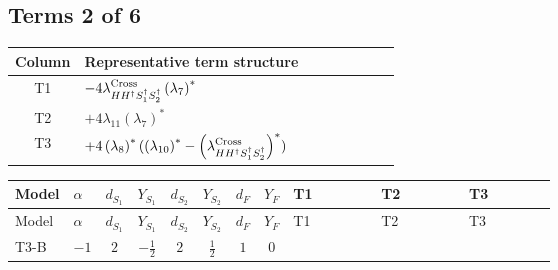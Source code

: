 \documentclass[8pt]{article}
\begin{document}
\begin{landscape}
\subsection*{Terms 2 of 6}
\begin{center}
\begin{tabular}{@{}c >{\raggedright\arraybackslash}p{0.82\linewidth}@{}}
\toprule
Column & Representative term structure \\
\midrule
T1 & \(\displaystyle -4 {\lambda_{H H^\dagger S_1^\dagger S_2^\dagger}^{\rm Cross}} \left({\lambda_7}\right)^{*}\) \\
\midrule
T2 & \(\displaystyle +4 {\lambda_{11}} \left({\lambda_7}\right)^{*}\) \\
\midrule
T3 & \(\displaystyle +4 \left({\lambda_8}\right)^{*} (\left({\lambda_{10}}\right)^{*}-\left({\lambda_{H H^\dagger S_1^\dagger S_2^\dagger}^{\rm Cross}}\right)^{*})\) \\
\midrule
\bottomrule
\end{tabular}
\end{center}
\smallskip
\tiny
\begin{longtable}{@{}llcccccc >{\raggedright\arraybackslash}p{0.21\linewidth} >{\raggedright\arraybackslash}p{0.21\linewidth} >{\raggedright\arraybackslash}p{0.21\linewidth}@{}}
\toprule
Model & $\alpha$ & $d_{S_1}$ & $Y_{S_1}$ & $d_{S_2}$ & $Y_{S_2}$ & $d_F$ & $Y_F$ & T1 & T2 & T3 \\
\midrule
\endfirsthead
\toprule
Model & $\alpha$ & $d_{S_1}$ & $Y_{S_1}$ & $d_{S_2}$ & $Y_{S_2}$ & $d_F$ & $Y_F$ & T1 & T2 & T3 \\
\midrule
\endhead
T3-B & $-1$ & $2$ & $-\frac{1}{2}$ & $2$ & $\frac{1}{2}$ & $1$ & $0$ & \scriptsize\adjustbox{max width=\linewidth}{$\begin{gathered} -4 {\lambda_{H H^\dagger S_1^\dagger S_2^\dagger}^{\rm Cross}} \left({\lambda_7}\right)^{*}\end{gathered}$} & \scriptsize\adjustbox{max width=\linewidth}{$\begin{gathered} +4 {\lambda_{11}} \left({\lambda_7}\right)^{*}\end{gathered}$} & \scriptsize\adjustbox{max width=\linewidth}{$\begin{gathered} +4 \left({\lambda_8}\right)^{*} (\left({\lambda_{10}}\right)^{*}-\left({\lambda_{H H^\dagger S_1^\dagger S_2^\dagger}^{\rm Cross}}\right)^{*})\end{gathered}$} \\
\midrule

\end{longtable}
\end{landscape}
\end{document}
